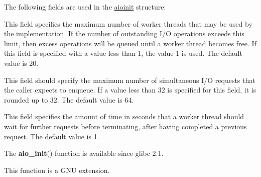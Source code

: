 \documentclass[]{article}
\let\realtextbf=\textbf
\renewcommand{\textbf}[1]{\textcolor{boldcolor}{\realtextbf{#1}}}
\renewcommand{\emph}[1]{\underline{#1}}
\begin{document}
The following fields are used in the \emph{aioinit} structure:

\begin{description}
\itemsep1pt\parskip0pt
\item[\emph{aio\_threads}]
This field specifies the maximum number of worker threads that may be
used by the implementation. If the number of outstanding I/O operations
exceeds this limit, then excess operations will be queued until a worker
thread becomes free. If this field is specified with a value less than
1, the value 1 is used. The default value is 20.
\end{description}

\begin{description}
\itemsep1pt\parskip0pt
\item[\emph{aio\_num}]
This field should specify the maximum number of simultaneous I/O
requests that the caller expects to enqueue. If a value less than 32 is
specified for this field, it is rounded up to 32. The default value is
64.
\end{description}

\begin{description}
\itemsep1pt\parskip0pt
\item[\emph{aio\_idle\_time}]
This field specifies the amount of time in seconds that a worker thread
should wait for further requests before terminating, after having
completed a previous request. The default value is 1.
\end{description}


The \textbf{aio\_init}() function is available since glibc 2.1.


This function is a GNU extension.

\end{document}
